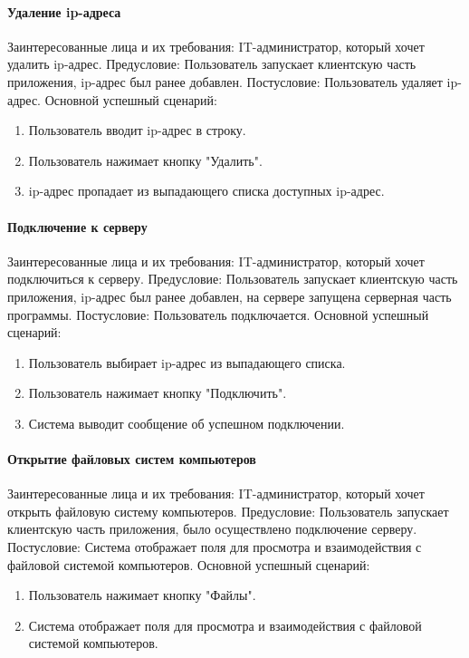 \paragraph{Удаление ip-адреса}
Заинтересованные лица и их требования: IT-администратор, который хочет удалить ip-адрес.
Предусловие: Пользователь запускает клиентскую часть приложения, ip-адрес был ранее добавлен.
Постусловие: Пользователь удаляет ip-адрес.
Основной успешный сценарий:
\begin{enumerate}
	\item Пользователь вводит ip-адрес в строку.
	\item Пользователь нажимает кнопку "Удалить".
	\item ip-адрес пропадает из выпадающего списка доступных ip-адрес.
\end{enumerate}

\paragraph{Подключение к серверу}
Заинтересованные лица и их требования: IT-администратор, который хочет подключиться к серверу.
Предусловие: Пользователь запускает клиентскую часть приложения, ip-адрес был ранее добавлен, на сервере запущена серверная часть программы.
Постусловие: Пользователь подключается.
Основной успешный сценарий:
\begin{enumerate}
	\item Пользователь выбирает ip-адрес из выпадающего списка.
	\item Пользователь нажимает кнопку "Подключить".
	\item Система выводит сообщение об успешном подключении.
\end{enumerate}

\paragraph{Открытие файловых систем компьютеров}
Заинтересованные лица и их требования: IT-администратор, который хочет открыть файловую систему компьютеров.
Предусловие: Пользователь запускает клиентскую часть приложения, было осуществлено подключение серверу.
Постусловие: Система отображает поля для просмотра и взаимодействия с файловой системой компьютеров.
Основной успешный сценарий:
\begin{enumerate}
	\item Пользователь нажимает кнопку "Файлы".
	\item Система отображает поля для просмотра и взаимодействия с файловой системой компьютеров.
\end{enumerate}

